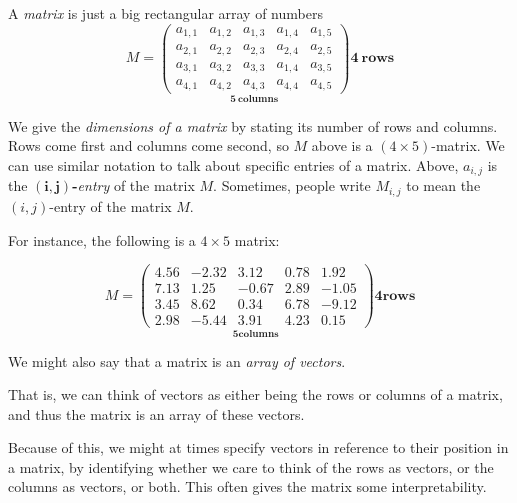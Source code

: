 \documentclass{ximera}
\begin{document}
\begin{remark}

\begin{definition}

A \emph{matrix} is just a big rectangular array of numbers
\[
M =
\underset{\displaystyle\boldsymbol{5}~\textbf{columns}}{\begin{pmatrix}
  a_{1,1} & a_{1,2} & a_{1,3} & a_{1,4} & a_{1,5} \\
  a_{2,1} & a_{2,2} & a_{2,3} & a_{2,4} & a_{2,5} \\
  a_{3,1} & a_{3,2} & a_{3,3} & a_{1,4} & a_{3,5} \\
  a_{4,1} & a_{4,2} & a_{4,3} & a_{4,4} & a_{4,5}
\end{pmatrix}}
\boldsymbol{4}~\textbf {rows}
\]

We give the \emph{dimensions of a matrix} by stating its number of rows
and columns. Rows come first and columns come second, so $M$ above is
a $(4\times 5)$-matrix. We can use similar notation to talk about
specific entries of a matrix. Above, $a_{i,j}$ is the
$\boldsymbol{(i,j)}${\bf-}\emph{entry} of the matrix $M$. Sometimes,
people write $M_{i,j}$ to mean the $(i,j)$-entry of the matrix $M$.

\end{definition}

For instance, the following is a $4\times 5$ matrix:

\[
M =
\underset{\displaystyle\boldsymbol{5}\textbf{columns}}{
\begin{pmatrix}
4.56 & -2.32 & 3.12 & 0.78 & 1.92 \\
7.13 & 1.25 & -0.67 & 2.89 & -1.05 \\
3.45 & 8.62 & 0.34 & 6.78 & -9.12 \\
2.98 & -5.44 & 3.91 & 4.23 & 0.15
\end{pmatrix}}
\boldsymbol{4}\textbf{rows}
\]

\begin{definition}

    We might also say that a matrix is an \emph{array of vectors}. 
    
    That is, we can think of vectors as either being the rows or columns of a matrix, and thus the matrix is an array of these vectors.

\end{definition}

Because of this, we might at times specify vectors in reference to their position in a matrix, by identifying whether we care to think of the rows as vectors, or the columns as vectors, or both. This often gives the matrix some interpretability.


\end{remark}
\end{document}
